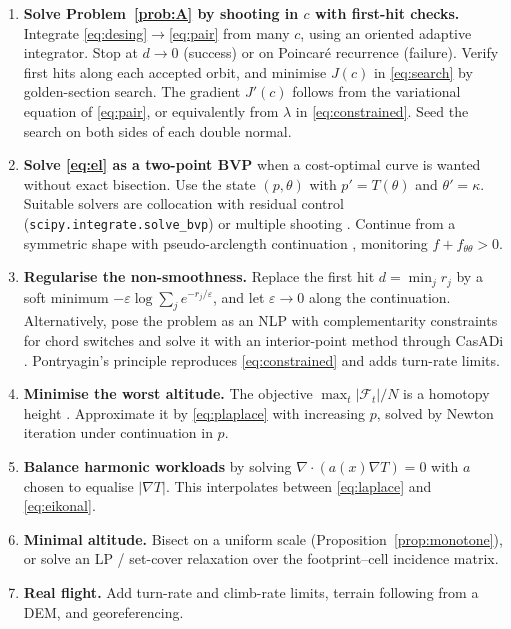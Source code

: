 \documentclass[11pt,a4paper]{article}
\numberwithin{equation}{section}
\theoremstyle{plain}
\theoremstyle{definition}
\theoremstyle{remark}
\begin{document}
\begin{enumerate}
  \item \textbf{Solve Problem~\ref{prob:A} by shooting in $c$ with first-hit checks.} Integrate \eqref{eq:desing}$\to$\eqref{eq:pair} from many $c$, using an oriented adaptive integrator. Stop at $d\to0$ (success) or on Poincar\'e recurrence (failure). Verify first hits along each accepted orbit, and minimise $J(c)$ in \eqref{eq:search} by golden-section search. The gradient $J'(c)$ follows from the variational equation of \eqref{eq:pair}, or equivalently from $\lambda$ in \eqref{eq:constrained}. Seed the search on both sides of each double normal.
  \item \textbf{Solve \eqref{eq:el} as a two-point BVP} when a cost-optimal curve is wanted without exact bisection. Use the state $(p,\theta)$ with $p'=T(\theta)$ and $\theta'=\kappa$. Suitable solvers are collocation with residual control \citep{kierzenka2001} (\texttt{scipy.integrate.solve\_bvp}) or multiple shooting \citep{keller1968,ascher1995}. Continue from a symmetric shape with pseudo-arclength continuation \citep{allgower2003}, monitoring $f+f_{\theta\theta}>0$.
  \item \textbf{Regularise the non-smoothness.} Replace the first hit $d=\min_j r_j$ by a soft minimum $-\varepsilon\log\sum_j e^{-r_j/\varepsilon}$, and let $\varepsilon\to0$ along the continuation. Alternatively, pose the problem as an NLP with complementarity constraints for chord switches and solve it with an interior-point method \citep{wachter2006} through CasADi \citep{andersson2019}. Pontryagin's principle \citep{pontryagin1962,bryson1975} reproduces \eqref{eq:constrained} and adds turn-rate limits.
  \item \textbf{Minimise the worst altitude.} The objective $\max_t|\mathcal F_t|/N$ is a homotopy height \citep{chambers2009}. Approximate it by \eqref{eq:plaplace} with increasing $p$, solved by Newton iteration under continuation in $p$.
  \item \textbf{Balance harmonic workloads} by solving $\nabla\cdot(a(x)\nabla T)=0$ with $a$ chosen to equalise $|\nabla T|$. This interpolates between \eqref{eq:laplace} and \eqref{eq:eikonal}.
  \item \textbf{Minimal altitude.} Bisect on a uniform scale (Proposition~\ref{prop:monotone}), or solve an LP / set-cover relaxation over the footprint--cell incidence matrix.
  \item \textbf{Real flight.} Add turn-rate and climb-rate limits, terrain following from a DEM, and georeferencing.
\end{enumerate}
\end{document}

